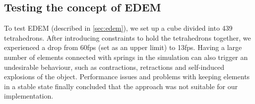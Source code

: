 \subsection{Testing the concept of EDEM}
To test EDEM (described in \cref{sec:edem}), we set up a cube divided into 439 tetrahedrons. After introducing constraints to hold the tetrahedrons together, we experienced a drop from 60fps (set as an upper limit) to 13fps. Having a large number of elements connected with springs in the simulation can also trigger an undesirable behaviour, such as contractions, retractions and self-induced explosions of the object. Performance issues and problems with keeping elements in a stable state finally concluded that the approach was not suitable for our implementation.

